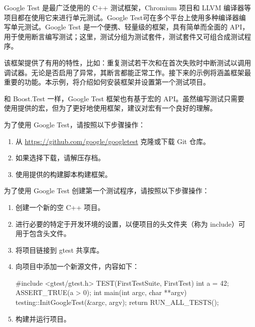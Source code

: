 
Google Test 是最广泛使用的 C++ 测试框架，Chromium 项目和 LLVM 编译器等项目都在使用它来进行单元测试。Google Test可在多个平台上使用多种编译器编写单元测试。Google Test 是一个便携、轻量级的框架，具有简单而全面的 API，用于使用断言编写测试；这里，测试分组为测试套件，测试套件又可组合成测试程序。

该框架提供了有用的特性，比如：重复测试若干次和在首次失败时中断测试以调用调试器。无论是否启用了异常，其断言都能正常工作。接下来的示例将涵盖框架最重要的功能。本示例，将介绍如何安装框架并设置第一个测试项目。


和 Boost.Test 一样，Google Test 框架也有基于宏的 API。虽然编写测试只需要使用提供的宏，但为了更好地使用框架，建议对宏有一个良好的理解。


为了使用 Google Test，请按照以下步骤操作：

\begin{enumerate}
\item
从 \url{https://github.com/google/googletest} 克隆或下载 Git 仓库。

\item
如果选择下载，请解压存档。

\item
使用提供的构建脚本构建框架。
\end{enumerate}

为了使用 Google Test 创建第一个测试程序，请按照以下步骤操作：

\begin{enumerate}
\item
创建一个新的空 C++ 项目。

\item
进行必要的特定于开发环境的设置，以便项目的头文件夹（称为 include）可用于包含头文件。

\item
将项目链接到 gtest 共享库。

\item
向项目中添加一个新源文件，内容如下：

\begin{cpp}
#include <gtest/gtest.h>
TEST(FirstTestSuite, FirstTest)
{
    int a = 42;
    ASSERT_TRUE(a > 0);
}
int main(int argc, char **argv)
{
    testing::InitGoogleTest(&argc, argv);
    return RUN_ALL_TESTS();
}
\end{cpp}

\item
构建并运行项目。
\end{enumerate}

